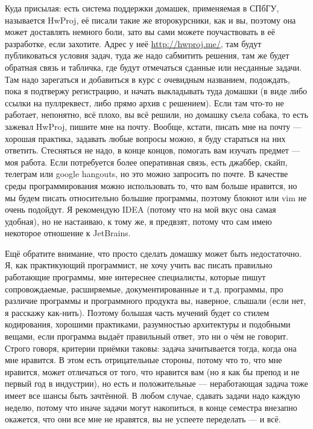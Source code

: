 \documentclass[a5paper]{article}
\begin{document}
Куда присылая: есть система поддержки домашек, применяемая в СПбГУ, называется HwProj, её писали такие же второкурсники, как и вы, поэтому она может доставлять немного боли, зато вы сами можете поучаствовать в её разработке, если захотите. Адрес у неё \url{http://hwproj.me/}, там будут публиковаться условия задач, туда же надо сабмитить решения, там же будет обратная связь и табличка, где будут отмечаться сданные или несданные задачи. Там надо зарегаться и добавиться в курс с очевидным названием, подождать, пока я подтвержу регистрацию, и начать выкладывать туда домашки (в виде либо ссылки на пуллреквест, либо прямо архив с решением). Если там что-то не работает, непонятно, всё плохо, вы всё решили, но домашку съела собака, то есть зажевал HwProj, пишите мне на почту. Вообще, кстати, писать мне на почту --- хорошая практика, задавать любые вопросы можно, я буду стараться на них ответить. Стесняться не надо, в конце концов, помогать вам изучать предмет --- моя работа. Если потребуется более оперативная связь, есть джаббер, скайп, телеграм или google hangouts, но это можно запросить по почте. В качестве среды программирования можно использовать то, что вам больше нравится, но мы будем писать относительно большие программы, поэтому блокнот или vim не очень подойдут. Я рекомендую IDEA (потому что на мой вкус она самая удобная), но не настаиваю, к тому же, я предвзят, потому что сам имею некоторое отношение к JetBrains.

Ещё обратите внимание, что просто сделать домашку может быть недостаточно. Я, как практикующий программист, не хочу учить вас писать правильно работающие программы, мне интереснее специалисты, которые пишут сопровождаемые, расширяемые, документированные и т.д. программы, про различие программы и программного продукта вы, наверное, слышали (если нет, я расскажу как-нить). Поэтому большая часть мучений будет со стилем кодирования, хорошими практиками, разумностью архитектуры и подобными вещами, если программа выдаёт правильный ответ, это ни о чём не говорит. Строго говоря, критерии приёмки таковы: задача зачитывается тогда, когда она мне нравится. В этом есть отрицательные стороны, потому что то, что мне нравится, может отличаться от того, что нравится вам (но я как бы препод и не первый год в индустрии), но есть и положительные --- неработающая задача тоже имеет все шансы быть зачтённой. В любом случае, сдавать задачи надо каждую неделю, потому что иначе задачи могут накопиться, в конце семестра внезапно окажется, что они все мне не нравятся, вы не успеете переделать --- и всё.
\end{document}
